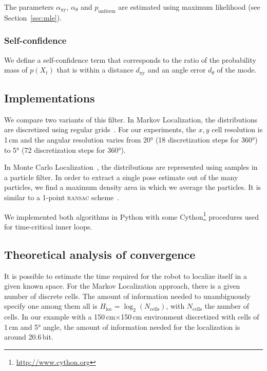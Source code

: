 \documentclass[letterpaper, 10pt, conference]{ieeeconf}
\newcommand{\sect}[1]{Section~\ref{sec:#1}}
\begin{document}
The parameters $\alpha_\mathrm{xy}$, $\alpha_\theta$ and $p_\mathrm{uniform}$ are estimated using maximum likelihood (see \sect{mle}).

\subsubsection{Self-confidence}

We define a self-confidence term that corresponds to the ratio of the probability mass of $p(X_t)$ that is within a distance $d_\mathrm{xy}$ and an angle error $d_\theta$ of the mode.

\subsection{Implementations}

We compare two variants of this filter.
In Markov Localization, the distributions are discretized using regular grids~\cite{fox1999markov}.
For our experiments, the $x,y$ cell resolution is 1\,cm and the angular resolution varies from 20° (18 discretization steps for 360°) to 5° (72 discretization steps for 360°).

In Monte Carlo Localization~\cite{dellaert1999monte}, the distributions are represented using samples in a particle filter.
In order to extract a single pose estimate out of the many particles, we find a maximum density area in which we average the particles.
It is similar to a 1-point \textsc{ransac} scheme~\cite{Fischler1981ransac}.

We implemented both algorithms in Python with some Cython\footnote{\url{http://www.cython.org}} procedures used for time-critical inner loops.

\subsection{Theoretical analysis of convergence}
\label{sec:theoreticalconv}

It is possible to estimate the time required for the robot to localize itself in a given known space.
For the Markov Localization approach, there is a given number of discrete cells.
The amount of information needed to unambiguously specify one among them all is $H_\mathrm{loc} = \log_2(N_\mathrm{cells})$, with $N_\mathrm{cells}$ the number of cells.
In our example with a 150\,cm$\times$150\,cm environment discretized with cells of 1\,cm and 5° angle, the amount of information needed for the localization is around 20.6\,bit.
\end{document}
